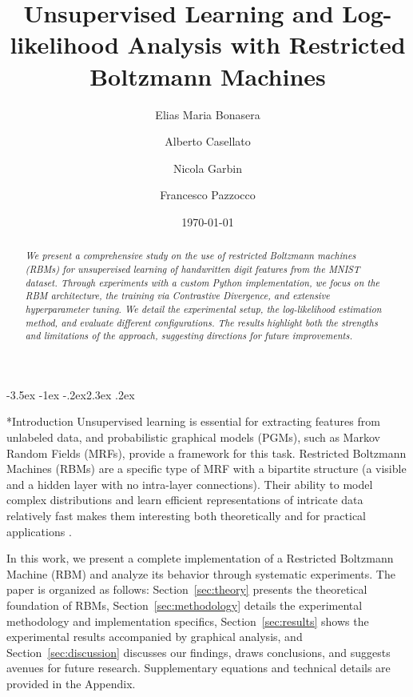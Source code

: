 \documentclass[prl,twocolumn]{revtex4-1}
\makeatletter
\renewcommand{\section}{\@startsection{section}{1}{\z@}%
    {-3.5ex \@plus -1ex \@minus -.2ex}{2.3ex \@plus.2ex}%
    {\normalfont\bfseries\raggedright}}
\makeatother
\begin{document}
\setcounter{secnumdepth}{1}

\title{Unsupervised Learning and Log-likelihood Analysis with Restricted Boltzmann Machines}

\author{Elias Maria Bonasera}
\author{Alberto Casellato}
\author{Nicola Garbin}
\author{Francesco Pazzocco}

\date{\today}

\begin{abstract}
\textit{We present a comprehensive study on the use of restricted Boltzmann machines (RBMs) for unsupervised learning of handwritten digit features from the MNIST dataset. Through experiments with a custom Python implementation, we focus on the RBM architecture, the training via Contrastive Divergence, and extensive hyperparameter tuning. We detail the experimental setup, the log-likelihood estimation method, and evaluate different configurations. The results highlight both the strengths and limitations of the approach, suggesting directions for future improvements.}
\end{abstract}

\maketitle

\section*{Introduction}
Unsupervised learning is essential for extracting features from unlabeled data, and probabilistic graphical models (PGMs), such as Markov Random Fields (MRFs), provide a framework for this task. Restricted Boltzmann Machines (RBMs) are a specific type of MRF with a bipartite structure (a visible and a hidden layer with no intra-layer connections). Their ability to model complex distributions and learn efficient representations of intricate data relatively fast makes them interesting both theoretically and for practical applications \cite{intro_ML,bortoletto, practical}.

In this work, we present a complete implementation of a Restricted Boltzmann Machine (RBM) and analyze its behavior through systematic experiments. The paper is organized as follows:
Section~\ref{sec:theory} presents the theoretical foundation of RBMs, Section~\ref{sec:methodology} details the experimental methodology and implementation specifics, Section~\ref{sec:results} shows the experimental results accompanied by graphical analysis, and Section~\ref{sec:discussion} discusses our findings, draws conclusions, and suggests avenues for future research. Supplementary equations and technical details are provided in the Appendix.
\end{document}
